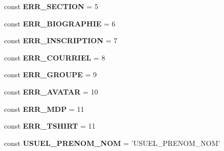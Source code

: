 \begin{DoxyCompactItemize}
\item 
\hypertarget{class_library_1_1_entities_1_1_membre_af0cd8728b372fe065f4cb2eb8224ed36}{const {\bfseries E\+R\+R\+\_\+\+S\+E\+C\+T\+I\+O\+N} = 5}\label{class_library_1_1_entities_1_1_membre_af0cd8728b372fe065f4cb2eb8224ed36}

\item 
\hypertarget{class_library_1_1_entities_1_1_membre_ae7957900e8faecfeed4b8d1205fb8d0c}{const {\bfseries E\+R\+R\+\_\+\+B\+I\+O\+G\+R\+A\+P\+H\+I\+E} = 6}\label{class_library_1_1_entities_1_1_membre_ae7957900e8faecfeed4b8d1205fb8d0c}

\item 
\hypertarget{class_library_1_1_entities_1_1_membre_ae21e44093d8a69921c6ecc92c4a1cc12}{const {\bfseries E\+R\+R\+\_\+\+I\+N\+S\+C\+R\+I\+P\+T\+I\+O\+N} = 7}\label{class_library_1_1_entities_1_1_membre_ae21e44093d8a69921c6ecc92c4a1cc12}

\item 
\hypertarget{class_library_1_1_entities_1_1_membre_a5eab3144689c8610aaee3c4b8a10c61d}{const {\bfseries E\+R\+R\+\_\+\+C\+O\+U\+R\+R\+I\+E\+L} = 8}\label{class_library_1_1_entities_1_1_membre_a5eab3144689c8610aaee3c4b8a10c61d}

\item 
\hypertarget{class_library_1_1_entities_1_1_membre_a7cbd95517f099a88e8140ad104f54bff}{const {\bfseries E\+R\+R\+\_\+\+G\+R\+O\+U\+P\+E} = 9}\label{class_library_1_1_entities_1_1_membre_a7cbd95517f099a88e8140ad104f54bff}

\item 
\hypertarget{class_library_1_1_entities_1_1_membre_a0597753228d1c20974d1d04804a20ff3}{const {\bfseries E\+R\+R\+\_\+\+A\+V\+A\+T\+A\+R} = 10}\label{class_library_1_1_entities_1_1_membre_a0597753228d1c20974d1d04804a20ff3}

\item 
\hypertarget{class_library_1_1_entities_1_1_membre_aee31c2396da47186963ed4ce4422e2de}{const {\bfseries E\+R\+R\+\_\+\+M\+D\+P} = 11}\label{class_library_1_1_entities_1_1_membre_aee31c2396da47186963ed4ce4422e2de}

\item 
\hypertarget{class_library_1_1_entities_1_1_membre_a90f341fca0d1ed880931e87c7f557546}{const {\bfseries E\+R\+R\+\_\+\+T\+S\+H\+I\+R\+T} = 11}\label{class_library_1_1_entities_1_1_membre_a90f341fca0d1ed880931e87c7f557546}

\item 
\hypertarget{class_library_1_1_entities_1_1_membre_a36a94220f96d60c49433383b90d1eb37}{const {\bfseries U\+S\+U\+E\+L\+\_\+\+P\+R\+E\+N\+O\+M\+\_\+\+N\+O\+M} = 'U\+S\+U\+E\+L\+\_\+\+P\+R\+E\+N\+O\+M\+\_\+\+N\+O\+M'}\label{class_library_1_1_entities_1_1_membre_a36a94220f96d60c49433383b90d1eb37}


\end{DoxyCompactItemize}
